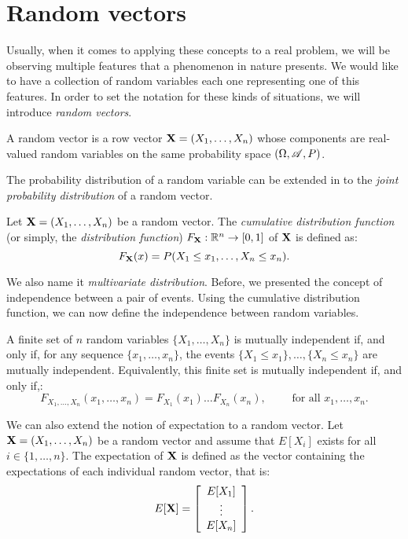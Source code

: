 \section{Random vectors}


Usually, when it comes to applying these concepts to a real problem, we will be observing multiple features that a phenomenon in nature presents. We would like to have a collection of random variables each one representing one of this features.
In order to set the notation for these kinds of situations, we will introduce \emph{random vectors}.

\begin{ndef}
  A random vector is a row vector $\mathbf{X} = (X_1,\dots,X_n)$ whose components are real-valued random variables on the same probability space $(\Omega,\mathscr{A},P)$.
\end{ndef}

The probability distribution of a random variable can be extended in to the \emph{joint probability distribution} of a random vector.

\begin{ndef}
Let $\mathbf{X} = (X_1,\dots,X_n)$ be a random vector. The \emph{cumulative distribution function} (or simply, the \emph{distribution function}) $F_{\mathbf{X}} : \mathbb{R}^n \to [0,1]$ of $\mathbf{X}$ is defined as:
$$
F_{\mathbf{X}}(x) = P(X_1 \leq x_1 , \dots, X_n \leq x_n).
$$
\end{ndef}

We also name it \emph{multivariate distribution}. Before, we presented the concept of independence between a pair of events. Using the cumulative distribution function, we can now define the independence between random variables.
\begin{ndef}
A finite set of $n$ random variables $\{X_1,\dots,X_n\}$ is mutually independent if, and only if, for any sequence $\{x_1,\dots,x_n\}$, the events $\{X_1 \leq x_1\}, \dots, \{X_n \leq x_n\}$ are mutually independent. 
Equivalently, this finite set is mutually independent if, and only if,:
$$
F_{X_1,\dots, X_n}(x_1,\dots,x_n) = F_{X_1}(x_1) \dots F_{X_n}(x_n), \quad \quad \text{ for all } x_1,\dots,x_n.
$$
\end{ndef}


We can also extend the notion of expectation to a random vector. Let $\mathbf{X} = (X_1,\dots,X_n)$ be a random vector and assume that $E[X_i]$ exists for all $i \in \{1, \dots, n \}$. The expectation of $\mathbf{X}$ is defined as the vector containing the expectations of each individual random vector, that is:
$$
E[\mathbf{X}] = \left[ \begin{array}{c} 
E[X_1]\\
\vdots\\
E[X_n]
\end{array} \right].
$$

